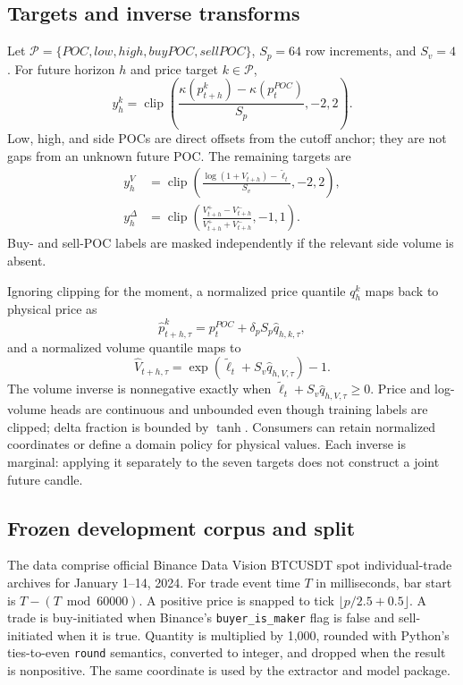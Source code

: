 \documentclass[10pt]{article}
\newcommand{\clip}{\operatorname{clip}}
\begin{document}
\subsection{Targets and inverse transforms}

Let $\mathcal P=\{POC,low,high,buyPOC,sellPOC\}$, $S_p=64$ row increments, and $S_v=4$. For future
horizon $h$ and price target $k\in\mathcal P$,
\begin{equation}
y_h^k=\clip\!\left(
\frac{\kappa(p_{t+h}^k)-\kappa(p_t^{POC})}{S_p},-2,2\right).
\label{eq:price-target}
\end{equation}
Low, high, and side POCs are direct offsets from the cutoff anchor; they are not gaps from an unknown
future POC. The remaining targets are
\begin{align}
y_h^V&=\clip\!\left(
\frac{\log(1+V_{t+h})-\widetilde\ell_t}{S_v},-2,2\right),
\label{eq:volume-target}\\
y_h^\Delta&=\clip\!\left(
\frac{V^+_{t+h}-V^-_{t+h}}{V^+_{t+h}+V^-_{t+h}},-1,1\right).
\label{eq:delta-target}
\end{align}
Buy- and sell-POC labels are masked independently if the relevant side volume is absent.

Ignoring clipping for the moment, a normalized price quantile $q_h^k$ maps back to physical price as
\begin{equation}
\widehat p_{t+h,\tau}^k=p_t^{POC}+\delta_p S_p\widehat q_{h,k,\tau},
\end{equation}
and a normalized volume quantile maps to
\begin{equation}
\widehat V_{t+h,\tau}=\exp\!\left(\widetilde\ell_t+S_v\widehat q_{h,V,\tau}\right)-1.
\end{equation}
The volume inverse is nonnegative exactly when
$\widetilde\ell_t+S_v\widehat q_{h,V,\tau}\ge0$. Price and log-volume heads are continuous and
unbounded even though training labels are clipped; delta fraction is bounded by $\tanh$. Consumers
can retain normalized coordinates or define a domain policy for physical values. Each inverse is
marginal: applying it separately to the seven targets does not construct a joint future candle.

\subsection{Frozen development corpus and split}

The data comprise official Binance Data Vision BTCUSDT spot individual-trade archives
\citep{binance2024datavision} for January 1--14, 2024. For trade event time $T$ in milliseconds, bar
start is $T-(T\bmod60000)$. A positive price is snapped to tick
$\lfloor p/2.5+0.5\rfloor$. A trade is buy-initiated when Binance's
\texttt{buyer\_is\_maker} flag is false and sell-initiated when it is true. Quantity is multiplied by
1,000, rounded with Python's ties-to-even \texttt{round} semantics, converted to integer, and dropped
when the result is nonpositive. The same coordinate is used by the extractor and model package.
\end{document}
